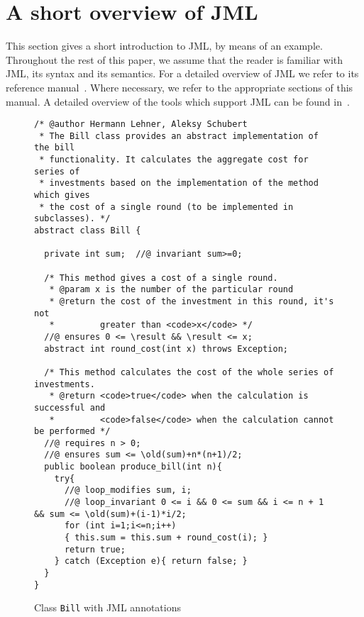 \section{A short overview of JML}\label{SecJMLOverview}

This section gives a short introduction to JML, by means of an
example. Throughout the rest of this paper, we assume that the
reader is familiar with JML, its syntax and its semantics. For a
detailed overview of JML we refer to its reference
manual~\cite{JMLReferenceManual05}. Where necessary, we refer to the
appropriate sections of this manual. A detailed overview of the tools
which support JML can be found in~\cite{BurdyCCEKLLP05}.

\begin{figure}[th!]
{\small
\begin{verbatim}
/* @author Hermann Lehner, Aleksy Schubert
 * The Bill class provides an abstract implementation of the bill 
 * functionality. It calculates the aggregate cost for series of
 * investments based on the implementation of the method which gives 
 * the cost of a single round (to be implemented in subclasses). */
abstract class Bill {
  
  private int sum;  //@ invariant sum>=0;
 
  /* This method gives a cost of a single round.
   * @param x is the number of the particular round
   * @return the cost of the investment in this round, it's not
   *         greater than <code>x</code> */
  //@ ensures 0 <= \result && \result <= x;
  abstract int round_cost(int x) throws Exception;
  
  /* This method calculates the cost of the whole series of investments.
   * @return <code>true</code> when the calculation is successful and
   *         <code>false</code> when the calculation cannot be performed */
  //@ requires n > 0;
  //@ ensures sum <= \old(sum)+n*(n+1)/2;
  public boolean produce_bill(int n){
    try{
      //@ loop_modifies sum, i;
      //@ loop_invariant 0 <= i && 0 <= sum && i <= n + 1 && sum <= \old(sum)+(i-1)*i/2;
      for (int i=1;i<=n;i++) 
      { this.sum = this.sum + round_cost(i); }
      return true;
    } catch (Exception e){ return false; }
  }
}
\end{verbatim}
}
\caption{Class \texttt{Bill} with JML annotations} 
\label{FigJMLSpec}
\end{figure}

